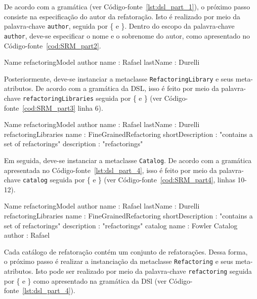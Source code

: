De acordo com a gramática (ver Código-fonte~\ref{lst:dsl_part_1}), o próximo passo consiste na especificação do autor da refatoração. Isto é realizado por meio da palavra-chave \texttt{author}, seguida por \{ e \}. Dentro do escopo da palavra-chave \texttt{author}, deve-se especificar o nome e o sobrenome do autor, como apresentado no Código-fonte~\ref{cod:SRM_part2}.

\begin{codigo}[caption={[Exemplo de uso da DSL - parte 2.] Exemplo de uso da DSL - parte 2.},escapeinside={(*@}{@*)}, basicstyle=\footnotesize, label={cod:SRM_part2}, language=myDSL]{Name}
refactoringModel {
    author {
		name : Rafael
		lastName : Durelli
	}
}
\end{codigo}

Posteriormente, deve-se instanciar a metaclasse \texttt{RefactoringLibrary} e seus meta-atributos. De acordo com a gramática da DSL, isso é feito por meio da palavra-chave \texttt{refactoring\-Libraries} seguida por \{ e \} (ver Código-fonte~\ref{cod:SRM_part3} linha 6). 

\begin{codigo}[caption={[Exemplo de uso da DSL - parte 3.] Exemplo de uso da DSL - parte 3.},escapeinside={(*@}{@*)}, basicstyle=\footnotesize, label={cod:SRM_part3}, language=myDSL]{Name}
refactoringModel {
    author {
		name : Rafael
		lastName : Durelli
	}
	refactoringLibraries {
	    name : FineGrainedRefactoring
		shortDescription : "contains a set of refactorings"
		description : "refactorings"
	}
}
\end{codigo}

Em seguida, deve-se instanciar a metaclasse \texttt{Catalog}. De acordo com a gramática apresentada no Código-fonte~\ref{lst:dsl_part_4}, isso é feito por meio da palavra-chave \texttt{catalog} seguida por \{ e \} (ver Código-fonte~\ref{cod:SRM_part4}, linhas 10-12).

\begin{codigo}[caption={[Exemplo de uso da DSL - parte 4.] Exemplo de uso da DSL - parte 4.},escapeinside={(*@}{@*)}, basicstyle=\footnotesize, label={cod:SRM_part4}, language=myDSL]{Name}
refactoringModel {
    author {
		name : Rafael
		lastName : Durelli
	}
	refactoringLibraries {
	    name : FineGrainedRefactoring
		shortDescription : "contains a set of refactorings"
		description : "refactorings"
		catalog {
			name : Fowler Catalog
			author : Rafael
		}
	}
}
\end{codigo}

Cada catálogo de refatoração contém um conjunto de refatorações. Dessa forma, o próximo passo é realizar a instanciação da metaclasse \texttt{Refactoring} e seus meta-atributos. Isto pode ser realizado por meio da palavra-chave \texttt{refactoring} seguida por \{ e \} como apresentado na gramática da DSl (ver Código-fonte~\ref{lst:dsl_part_4}).

